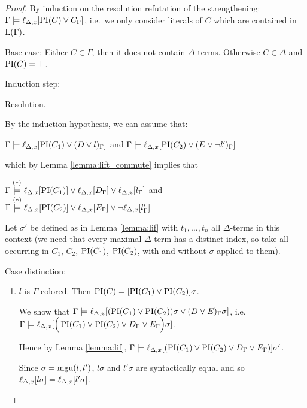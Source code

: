 \documentclass[,%
	paper=a4,%
	DIV14, 
	liststotoc,
	bibtotoc,
	draft=false,%
	numbers=noendperiod
]{scrartcl}
\newcommand{\lif}[1]{\lift{\Delta}{#1}{x}}
\begin{document}
\begin{proof}
	By induction on the resolution refutation of the strengthening: $\Gamma \entails \lif{\PI(C) \lor C_\Gamma}$, i.e.\ we only consider literals of $C$ which are contained in $\operatorname{L}(\Gamma)$.

	Base case:
	Either $C \in \Gamma$, then it does not contain $\Delta$-terms.
	Otherwise $C \in \Delta$ and $\operatorname{PI}(C) = \top$.

	Induction step:
	\begin{description}
		\item{Resolution.}
			\begin{prooftree}
			\end{prooftree}

			By the induction hypothesis, we can assume that:

			$\Gamma \entails \lif{\PI(C_1) \lor (D\lor l)_\Gamma}$ and $\Gamma \entails \lif{\PI(C_2) \lor (E\lor \lnot l')_\Gamma}$

			which by Lemma \ref{lemma:lift_commute} implies that

			$\Gamma \stackrel{(*)}\entails \lif{\PI(C_1)} \lor \lif{D_\Gamma} \lor \lif {l_\Gamma}$ and $\Gamma \stackrel{(\circ)}\entails \lif{\PI(C_2)} \lor \lif{E_\Gamma} \lor \lnot \lif{l'_\Gamma}$

			Let $\sigma'$ be defined as in Lemma \ref{lemma:lif} with $t_1, \ldots, t_n$ all $\Delta$-terms in this context (we need that every maximal $\Delta$-term has a distinct index, so take all occurring in $C_1$, $C_2$, $\operatorname{PI}(C_1)$, $\operatorname{PI}(C_2)$, with and without $\sigma$ applied to them).

			Case distinction:

			\begin{enumerate}
				\item $l$ is $\Gamma$-colored.
					Then $\operatorname{PI}(C) = [\operatorname{PI}(C_1) \lor \operatorname{PI}(C_2)]\sigma$. 

					We show that $\Gamma \entails \lif{ (\PI(C_1) \lor \PI(C_2))\sigma \lor (D \lor E)_\Gamma\sigma}$,
					\newline 
					i.e.~$\Gamma \entails \lif{ \Big(\PI(C_1) \lor \PI(C_2) \lor D_\Gamma \lor E_\Gamma\Big)\sigma} $.


					Hence by Lemma \ref{lemma:lif},
					$\Gamma \entails \lif{(\PI(C_1) \lor \PI(C_2) \lor D_\Gamma \lor E_\Gamma)}\sigma' $.

					Since $\sigma = \operatorname{mgu}(l, l')$, $l\sigma$ and $l'\sigma$ are syntactically equal and so $\lif{l\sigma} = \lif{l'\sigma}$.
					

\end{enumerate}
\end{description}
\end{proof}
\end{document}
